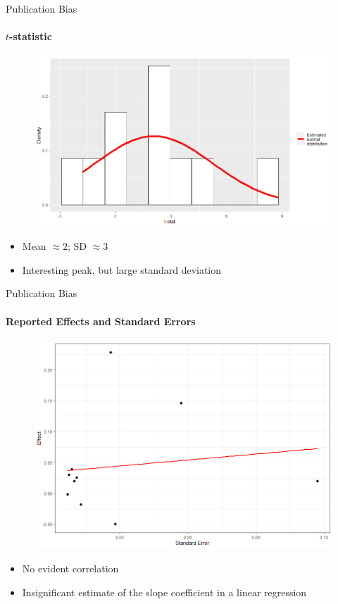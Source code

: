 \documentclass{beamer}
\begin{document}
\begin{frame}{Publication Bias}
\framesubtitle{$t$-statistic}
\begin{figure}
    \centering
    \includegraphics[scale=0.4]{figures/tstat_distribution.png}
    \label{fig:tstat}
\end{figure}
\begin{itemize}
    \item Mean $\approx 2$; SD $\approx 3$
    \item Interesting peak, but large standard deviation
\end{itemize}
\end{frame}

\begin{frame}{Publication Bias}
\framesubtitle{Reported Effects and Standard Errors}
    \begin{figure}
        \centering
        \includegraphics[scale=0.3]{figures/se_effect.png}
        \label{fig:effectse}
    \end{figure}
    \begin{itemize}
        \item No evident correlation
        \item Insignificant estimate of the slope coefficient in a linear regression
    \end{itemize}
\end{frame}
\end{document}
